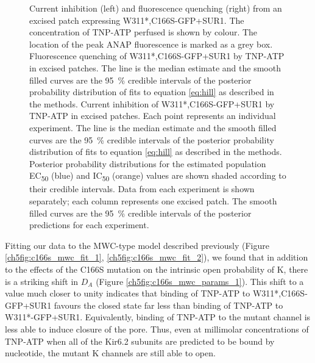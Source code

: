 \begin{figure}[hbtp]
	\caption[C166S alters sensitivity to nucleotide inhibition]{
	 Current inhibition (left) and fluorescence quenching (right) from an excised patch expressing W311*,C166S-GFP+SUR1.
	The concentration of TNP-ATP perfused is shown by colour.
	The location of the peak ANAP fluorescence is marked as a grey box.
	 Fluorescence quenching of W311*,C166S-GFP+SUR1 by TNP-ATP in excised patches.
	The line is the median estimate and the smooth filled curves are the \SI{95}{\percent} credible intervals of the posterior probability distribution of fits to equation \ref{eq:hill} as described in the methods.
	 Current inhibition of W311*,C166S-GFP+SUR1 by TNP-ATP in excised patches.
	Each point represents an individual experiment.
	The line is the median estimate and the smooth filled curves are the \SI{95}{\percent} credible intervals of the posterior probability distribution of fits to equation \ref{eq:hill} as described in the methods.
	 Posterior probability distributions for the estimated population EC\textsubscript{50} (blue) and IC\textsubscript{50} (orange) values are shown shaded according to their credible intervals.
	 Data from each experiment is shown separately; each column represents one excised patch.
	The smooth filled curves are the \SI{95}{\percent} credible intervals of the posterior predictions for each experiment.
	}\label{ch5fig:c166s_2}
\end{figure}

Fitting our data to the MWC-type model described previously (Figure \ref{ch5fig:c166s_mwc_fit_1}, \ref{ch5fig:c166s_mwc_fit_2}), we found that in addition to the effects of the C166S mutation on the intrinsic open probability of K\ATP{}, there is a striking shift in $D_A$ (Figure \ref{ch5fig:c166s_mwc_params_1}).
This shift to a value much closer to unity indicates that binding of TNP-ATP to W311*,C166S-GFP+SUR1 favours the closed state far less than binding of TNP-ATP to W311*-GFP+SUR1.
Equivalently, binding of TNP-ATP to the mutant channel is less able to induce closure of the pore.
Thus, even at millimolar concentrations of TNP-ATP when all of the Kir6.2 subunits are predicted to be bound by nucleotide, the mutant K\ATP{} channels are still able to open.

